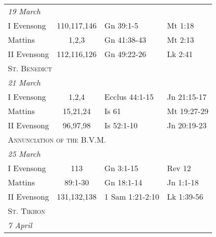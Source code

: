 \begin{longtable}{l c l l}
\multicolumn{4}{l}{\textit{19 March}}\\
\hspace{1em} I Evensong&110,117,146&Gn 39:1-5&Mt 1:18\\
\hspace{1em} Mattins&1,2,3&Gn 41:38-43&Mt 2:13\\
\hspace{1em} II Evensong&112,116,126&Gn 49:22-26&Lk 2:41\\
\multicolumn{4}{l}{\textsc{St. Benedict}}\\
\multicolumn{4}{l}{\textit{21 March}}\\
\hspace{1em} I Evensong&1,2,4&Ecclus 44:1-15&Jn 21:15-17\\
\hspace{1em} Mattins&15,21,24&Is 61&Mt 19:27-29\\
\hspace{1em} II Evensong&96,97,98&Is 52:1-10&Jn 20:19-23\\
%
%
\multicolumn{4}{l}{\textsc{Annunciation of the B.V.M.}}\\
\multicolumn{4}{l}{\textit{25 March}}\\
\hspace{1em} I Evensong&113&Gn 3:1-15&Rev 12\\
\hspace{1em} Mattins&89:1-30&Gn 18:1-14&Jn 1:1-18\\
\hspace{1em} II Evensong&131,132,138&1 Sam 1:21-2:10&Lk 1:39-56\\
\multicolumn{4}{l}{\textsc{St. Tikhon}}\\
\multicolumn{4}{l}{\textit{7 April}}\\

\end{longtable}
